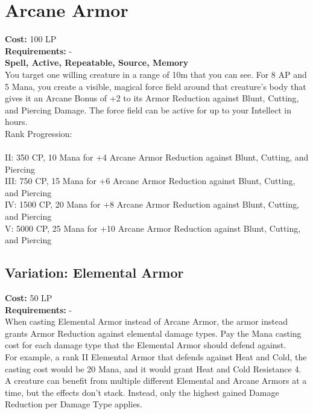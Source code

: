\section{Arcane Armor}\label{spell:arcaneArmor}
\textbf{Cost:} 100 LP\\
\textbf{Requirements:} -\\
\textbf{Spell, Active, Repeatable, Source, Memory}\\
You target one willing creature in a range of 10m that you can see.
For 8 AP and 5 Mana, you create a visible, magical force field around that creature's body that gives it an Arcane Bonus of +2 to its Armor Reduction against Blunt, Cutting, and Piercing Damage.
The force field can be active for up to your Intellect in hours.
\\
Rank Progression:\\
\\
II: 350 CP, 10 Mana for +4 Arcane Armor Reduction against Blunt, Cutting, and Piercing\\
III: 750 CP, 15 Mana for +6 Arcane Armor Reduction against Blunt, Cutting, and Piercing\\
IV: 1500 CP, 20 Mana for +8 Arcane Armor Reduction against Blunt, Cutting, and Piercing\\
V: 5000 CP, 25 Mana for +10 Arcane Armor Reduction against Blunt, Cutting, and Piercing\\

\subsection{Variation: Elemental Armor}\label{spell:elementalArmor}
\textbf{Cost:} 50 LP\\
\textbf{Requirements:} -\\
When casting Elemental Armor instead of Arcane Armor, the armor instead grants Armor Reduction against elemental damage types.
Pay the Mana casting cost for each damage type that the Elemental Armor should defend against.\\
For example, a rank II Elemental Armor that defends against Heat and Cold, the casting cost would be 20 Mana, and it would grant Heat and Cold Resistance 4.\\
A creature can benefit from multiple different Elemental and Arcane Armors at a time, but the effects don't stack.
Instead, only the highest gained Damage Reduction per Damage Type applies.